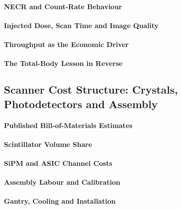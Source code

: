 \paragraph{NECR and Count-Rate Behaviour}

\paragraph{Injected Dose, Scan Time and Image Quality}

\paragraph{Throughput as the Economic Driver}

\paragraph{The Total-Body Lesson in Reverse}

\subsection{Scanner Cost Structure: Crystals, Photodetectors and Assembly}
\label{sec:cost-structure}

\paragraph{Published Bill-of-Materials Estimates}

\paragraph{Scintillator Volume Share}

\paragraph{SiPM and ASIC Channel Costs}

\paragraph{Assembly Labour and Calibration}

\paragraph{Gantry, Cooling and Installation}

